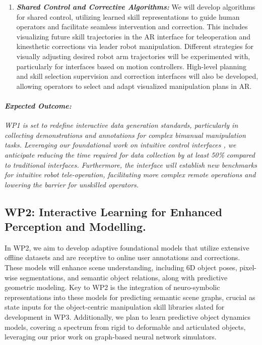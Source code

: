 \documentclass{erc-B2}
\begin{document}
\begin{enumerate}
\item \textit{\textbf{Shared Control and Corrective Algorithms:}} We will develop algorithms for shared control, utilizing learned skill representations to guide human operators and facilitate seamless intervention and correction. This includes visualizing future skill trajectories in the AR interface for teleoperation and kinesthetic corrections via leader robot manipulation. Different strategies for visually adjusting desired robot arm trajectories will be experimented with, particularly for interfaces based on motion controllers. High-level planning and skill selection supervision and correction interfaces will also be developed, allowing operators to select and adapt visualized manipulation plans in AR.
\end{enumerate}

\paragraph{\textit{Expected Outcome:}} \textit{ WP1 is set to redefine interactive data generation standards, particularly in collecting demonstrations and annotations for complex bimanual manipulation tasks. Leveraging our foundational work on intuitive control interfaces \cite{CITE}, we anticipate reducing the time required for data collection by at least 50\% compared to traditional interfaces. Furthermore, the interface will establish new benchmarks for intuitive robot tele-operation, facilitating more complex remote operations and lowering the barrier for unskilled operators.}


\subsection{WP2: Interactive Learning for Enhanced Perception and Modelling.}
In WP2, we aim to develop adaptive foundational models that utilize extensive offline datasets and are receptive to online user annotations and corrections. These models will enhance scene understanding, including 6D object poses, pixel-wise segmentations, and semantic object relations, along with predictive geometric modeling. Key to WP2 is the integration of neuro-symbolic representations into these models for predicting semantic scene graphs, crucial as state inputs for the object-centric manipulation skill libraries slated for development in WP3. Additionally, we plan to learn predictive object dynamics models, covering a spectrum from rigid to deformable and articulated objects, leveraging our prior work on graph-based neural network simulators.
\end{document}
